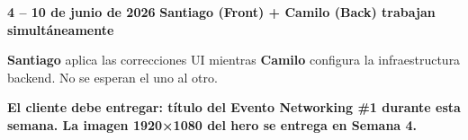 \documentclass[11pt]{article}
\begin{document}
\medskip
{\small\color{op-textsec} \textbf{4 -- 10 de junio de 2026} \hfill \textbf{Santiago (Front) + Camilo (Back) trabajan simultáneamente}}

\medskip

\textbf{Santiago} aplica las correcciones UI mientras \textbf{Camilo} configura la infraestructura backend. No se esperan el uno al otro.

\vspace{0.2cm}

\begin{tcolorbox}[op-aviso]
  \small\bfseries\color{op-rosa-dark}
  El cliente debe entregar: título del Evento Networking \#1 durante esta semana. La imagen 1920×1080 del hero se entrega en Semana 4.
\end{tcolorbox}

\vspace{0.3cm}
\end{document}
